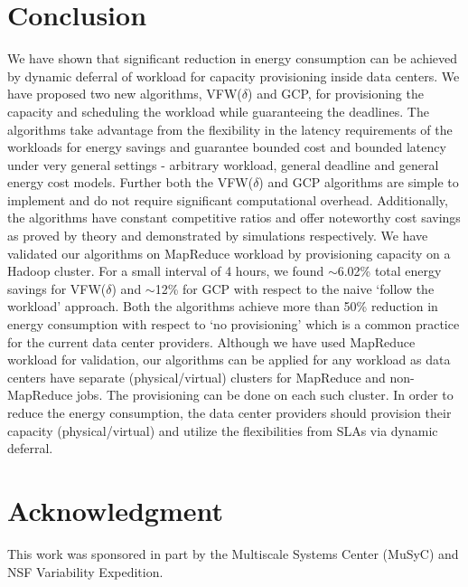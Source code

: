 \documentclass[10pt,conference,compsocconf,letterpaper]{IEEEtran}
\begin{document}
\section{Conclusion}
We have shown that significant reduction in energy consumption can be achieved by dynamic deferral of workload for capacity provisioning inside data centers. We have proposed two new algorithms, VFW($\delta$) and GCP, for provisioning the capacity and scheduling the workload while guaranteeing the deadlines. The algorithms take advantage from the flexibility in the latency requirements of the workloads for energy savings and guarantee bounded cost and bounded latency under very general settings - arbitrary workload, general deadline and general energy cost models. Further both the VFW($\delta$) and GCP algorithms are simple to implement and do not require significant computational overhead. Additionally, the algorithms have constant competitive ratios and offer noteworthy cost savings as proved by theory and demonstrated by simulations respectively. We have validated our algorithms on MapReduce workload by provisioning capacity on a Hadoop cluster. For a small interval of 4 hours, we found $\sim$6.02\% total energy savings for VFW($\delta$) and $\sim$12\% for GCP with respect to the naive `follow the workload' approach. Both the algorithms achieve more than 50\% reduction in energy consumption with respect to `no provisioning' which is a common practice for the current data center providers. Although we have used MapReduce workload for validation, our algorithms can be applied for any workload as data centers have separate (physical/virtual) clusters for MapReduce and non-MapReduce jobs. The provisioning can be done on each such cluster. In order to reduce the energy consumption, the data center providers should provision their capacity (physical/virtual) and utilize the flexibilities from SLAs via dynamic deferral.





\section*{Acknowledgment}
This work was sponsored in part by the Multiscale Systems
Center (MuSyC) and NSF Variability Expedition.
\end{document}

